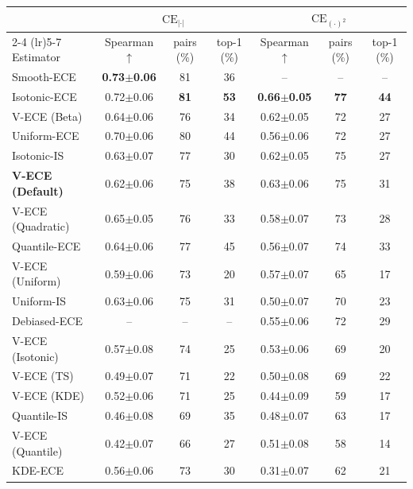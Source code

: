 \begin{tabular}{l ccc ccc}
\toprule
& \multicolumn{3}{c}{$\mathrm{CE}_{|\cdot|}$} & \multicolumn{3}{c}{$\mathrm{CE}_{(\cdot)^2}$} \\
\cmidrule(lr){2-4} \cmidrule(lr){5-7}
Estimator & Spearman $\uparrow$ & pairs (\%) & top-1 (\%) & Spearman $\uparrow$ & pairs (\%) & top-1 (\%) \\
\midrule
Smooth-ECE & \textbf{0.73{\scriptsize$\pm$0.06}} & 81 & 36 & -- & -- & -- \\
Isotonic-ECE & 0.72{\scriptsize$\pm$0.06} & \textbf{81} & \textbf{53} & \textbf{0.66{\scriptsize$\pm$0.05}} & \textbf{77} & \textbf{44} \\
V-ECE (Beta) & 0.64{\scriptsize$\pm$0.06} & 76 & 34 & 0.62{\scriptsize$\pm$0.05} & 72 & 27 \\
Uniform-ECE & 0.70{\scriptsize$\pm$0.06} & 80 & 44 & 0.56{\scriptsize$\pm$0.06} & 72 & 27 \\
Isotonic-IS & 0.63{\scriptsize$\pm$0.07} & 77 & 30 & 0.62{\scriptsize$\pm$0.05} & 75 & 27 \\
\textbf{V-ECE (Default)} & 0.62{\scriptsize$\pm$0.06} & 75 & 38 & 0.63{\scriptsize$\pm$0.06} & 75 & 31 \\
V-ECE (Quadratic) & 0.65{\scriptsize$\pm$0.05} & 76 & 33 & 0.58{\scriptsize$\pm$0.07} & 73 & 28 \\
Quantile-ECE & 0.64{\scriptsize$\pm$0.06} & 77 & 45 & 0.56{\scriptsize$\pm$0.07} & 74 & 33 \\
V-ECE (Uniform) & 0.59{\scriptsize$\pm$0.06} & 73 & 20 & 0.57{\scriptsize$\pm$0.07} & 65 & 17 \\
Uniform-IS & 0.63{\scriptsize$\pm$0.06} & 75 & 31 & 0.50{\scriptsize$\pm$0.07} & 70 & 23 \\
Debiased-ECE & -- & -- & -- & 0.55{\scriptsize$\pm$0.06} & 72 & 29 \\
V-ECE (Isotonic) & 0.57{\scriptsize$\pm$0.08} & 74 & 25 & 0.53{\scriptsize$\pm$0.06} & 69 & 20 \\
V-ECE (TS) & 0.49{\scriptsize$\pm$0.07} & 71 & 22 & 0.50{\scriptsize$\pm$0.08} & 69 & 22 \\
V-ECE (KDE) & 0.52{\scriptsize$\pm$0.06} & 71 & 25 & 0.44{\scriptsize$\pm$0.09} & 59 & 17 \\
Quantile-IS & 0.46{\scriptsize$\pm$0.08} & 69 & 35 & 0.48{\scriptsize$\pm$0.07} & 63 & 17 \\
V-ECE (Quantile) & 0.42{\scriptsize$\pm$0.07} & 66 & 27 & 0.51{\scriptsize$\pm$0.08} & 58 & 14 \\
KDE-ECE & 0.56{\scriptsize$\pm$0.06} & 73 & 30 & 0.31{\scriptsize$\pm$0.07} & 62 & 21 \\
\bottomrule
\end{tabular}
